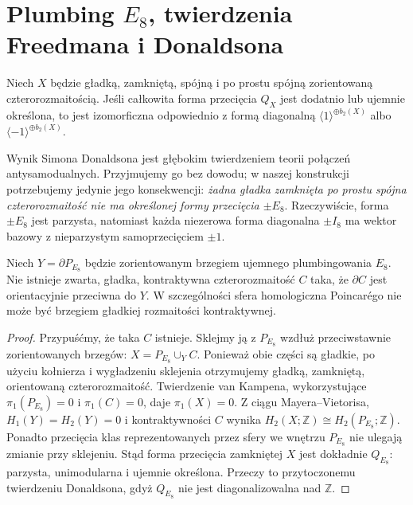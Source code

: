 \section{Plumbing \texorpdfstring{$E_8$}{E8}, twierdzenia Freedmana i Donaldsona}
\label{sec:tg-plumbing-freedman}

\begin{twierdzenie}
Niech $X$ będzie gładką, zamkniętą, spójną i po prostu
spójną zorientowaną czterorozmaitością. Jeśli całkowita
forma przecięcia $Q_X$ jest dodatnio lub ujemnie określona,
to jest izomorficzna odpowiednio z formą diagonalną
$\langle1\rangle^{\oplus b_2(X)}$ albo
$\langle-1\rangle^{\oplus b_2(X)}$.
\end{twierdzenie}

Wynik Simona Donaldsona jest głębokim twierdzeniem
teorii połączeń antysamodualnych. Przyjmujemy go bez dowodu;
w naszej konstrukcji potrzebujemy jedynie jego konsekwencji:
\emph{żadna gładka zamknięta po prostu spójna czterorozmaitość
nie ma określonej formy przecięcia $\pm E_8$}.
Rzeczywiście, forma $\pm E_8$ jest parzysta, natomiast każda
niezerowa forma diagonalna $\pm I_8$ ma wektor bazowy
z nieparzystym samoprzecięciem $\pm1$.

\begin{twierdzenie}
\label{thm:tg-E8-no-smooth-fill}
Niech $Y=\partial P_{E_8}$ będzie zorientowanym brzegiem
ujemnego plumbingowania $E_8$. Nie istnieje zwarta,
gładka, kontraktywna czterorozmaitość $C$ taka, że
$\partial C$ jest orientacyjnie przeciwna do $Y$.
W szczególności sfera homologiczna Poincarégo nie może
być brzegiem gładkiej rozmaitości kontraktywnej.
\end{twierdzenie}
\begin{proof}
Przypuśćmy, że taka $C$ istnieje. Sklejmy ją z
$P_{E_8}$ wzdłuż przeciwstawnie zorientowanych brzegów:
$X=P_{E_8}\cup_Y C$. Ponieważ obie części są gładkie,
po użyciu kołnierza i wygładzeniu sklejenia otrzymujemy
gładką, zamkniętą, orientowaną czterorozmaitość.
Twierdzenie van Kampena, wykorzystujące
$\pi_1(P_{E_8})=0$ i $\pi_1(C)=0$, daje
$\pi_1(X)=0$. Z ciągu Mayera--Vietorisa,
$H_1(Y)=H_2(Y)=0$ i kontraktywności $C$ wynika
$H_2(X;\mathbb Z)\cong H_2(P_{E_8};\mathbb Z)$.
Ponadto przecięcia klas reprezentowanych przez sfery
we wnętrzu $P_{E_8}$ nie ulegają zmianie przy sklejeniu.
Stąd forma przecięcia zamkniętej $X$ jest dokładnie
$Q_{E_8}$: parzysta, unimodularna i ujemnie określona.
Przeczy to przytoczonemu twierdzeniu Donaldsona,
gdyż $Q_{E_8}$ nie jest diagonalizowalna nad $\mathbb Z$.
\end{proof}

